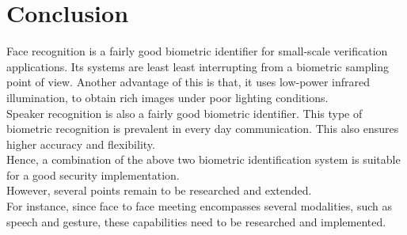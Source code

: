 \chapter{Conclusion}

Face recognition is a fairly good biometric identifier for small-scale verification applications. Its systems are least least interrupting from a biometric sampling point of view. Another advantage of this is that, it uses low-power infrared illumination, to obtain rich images under poor lighting conditions. \\
Speaker recognition is also a fairly good biometric identifier. This type of biometric recognition is prevalent in every day communication. This also ensures higher accuracy and flexibility. \\
Hence, a combination of the above two biometric identification system is suitable for a good security implementation. \\
However, several points remain to be researched and extended. \\
For instance, since face to face meeting encompasses several modalities, such as speech and gesture, these capabilities need to be researched and implemented. \\
